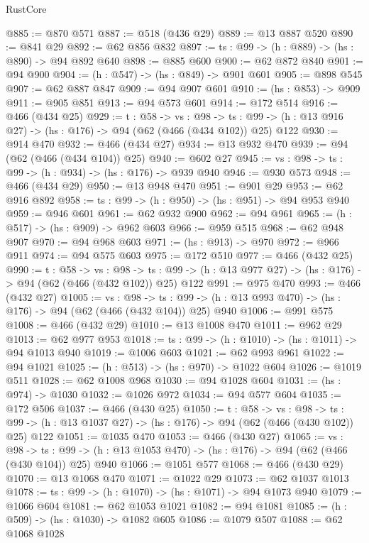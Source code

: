 \begin{lexlean}{RustCore}
\begin{coremodule}
@885 := @870 @571
@887 := @518 (@436 @29)
@889 := @13 @887 @520
@890 := @841 @29
@892 := @62 @856 @832
@897 := {ts : @99} -> (h : @889) -> (hs : @890) -> @94 @892 @640
@898 := @885 @600
@900 := @62 @872 @840
@901 := @94 @900
@904 := (h : @547) -> (hs : @849) -> @901 @601
@905 := @898 @545
@907 := @62 @887 @847
@909 := @94 @907 @601
@910 := (hs : @853) -> @909
@911 := @905 @851
@913 := @94 @573 @601
@914 := @172 @514
@916 := @466 (@434 @25)
@929 := {t : @58} ->
  {vs : @98} ->
  {ts : @99} -> (h : @13 @916 @27) -> (hs : @176) -> @94 (@62 (@466 (@434 @102)) @25) @122
@930 := @914 @470
@932 := @466 (@434 @27)
@934 := @13 @932 @470
@939 := @94 (@62 (@466 (@434 @104)) @25)
@940 := @602 @27
@945 := {vs : @98} -> {ts : @99} -> (h : @934) -> (hs : @176) -> @939 @940
@946 := @930 @573
@948 := @466 (@434 @29)
@950 := @13 @948 @470
@951 := @901 @29
@953 := @62 @916 @892
@958 := {ts : @99} -> (h : @950) -> (hs : @951) -> @94 @953 @940
@959 := @946 @601
@961 := @62 @932 @900
@962 := @94 @961
@965 := (h : @517) -> (hs : @909) -> @962 @603
@966 := @959 @515
@968 := @62 @948 @907
@970 := @94 @968 @603
@971 := (hs : @913) -> @970
@972 := @966 @911
@974 := @94 @575 @603
@975 := @172 @510
@977 := @466 (@432 @25)
@990 := {t : @58} ->
  {vs : @98} ->
  {ts : @99} -> (h : @13 @977 @27) -> (hs : @176) -> @94 (@62 (@466 (@432 @102)) @25) @122
@991 := @975 @470
@993 := @466 (@432 @27)
@1005 := {vs : @98} ->
  {ts : @99} -> (h : @13 @993 @470) -> (hs : @176) -> @94 (@62 (@466 (@432 @104)) @25) @940
@1006 := @991 @575
@1008 := @466 (@432 @29)
@1010 := @13 @1008 @470
@1011 := @962 @29
@1013 := @62 @977 @953
@1018 := {ts : @99} -> (h : @1010) -> (hs : @1011) -> @94 @1013 @940
@1019 := @1006 @603
@1021 := @62 @993 @961
@1022 := @94 @1021
@1025 := (h : @513) -> (hs : @970) -> @1022 @604
@1026 := @1019 @511
@1028 := @62 @1008 @968
@1030 := @94 @1028 @604
@1031 := (hs : @974) -> @1030
@1032 := @1026 @972
@1034 := @94 @577 @604
@1035 := @172 @506
@1037 := @466 (@430 @25)
@1050 := {t : @58} ->
  {vs : @98} ->
  {ts : @99} -> (h : @13 @1037 @27) -> (hs : @176) -> @94 (@62 (@466 (@430 @102)) @25) @122
@1051 := @1035 @470
@1053 := @466 (@430 @27)
@1065 := {vs : @98} ->
  {ts : @99} -> (h : @13 @1053 @470) -> (hs : @176) -> @94 (@62 (@466 (@430 @104)) @25) @940
@1066 := @1051 @577
@1068 := @466 (@430 @29)
@1070 := @13 @1068 @470
@1071 := @1022 @29
@1073 := @62 @1037 @1013
@1078 := {ts : @99} -> (h : @1070) -> (hs : @1071) -> @94 @1073 @940
@1079 := @1066 @604
@1081 := @62 @1053 @1021
@1082 := @94 @1081
@1085 := (h : @509) -> (hs : @1030) -> @1082 @605
@1086 := @1079 @507
@1088 := @62 @1068 @1028

\end{coremodule}
\end{lexlean}
